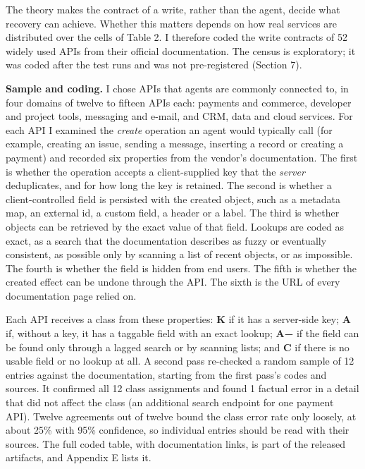 \documentclass[
  10pt,
]{article}
\begin{document}
The theory makes the contract of a write, rather than the agent, decide
what recovery can achieve. Whether this matters depends on how real
services are distributed over the cells of Table 2. I therefore coded
the write contracts of 52 widely used APIs from their official
documentation. The census is exploratory; it was coded after the test
runs and was not pre-registered (Section 7).

\textbf{Sample and coding.} I chose APIs that agents are commonly
connected to, in four domains of twelve to fifteen APIs each: payments
and commerce, developer and project tools, messaging and e-mail, and
CRM, data and cloud services. For each API I examined the \emph{create}
operation an agent would typically call (for example, creating an issue,
sending a message, inserting a record or creating a payment) and
recorded six properties from the vendor's documentation. The first is
whether the operation accepts a client-supplied key that the
\emph{server} deduplicates, and for how long the key is retained. The
second is whether a client-controlled field is persisted with the
created object, such as a metadata map, an external id, a custom field,
a header or a label. The third is whether objects can be retrieved by
the exact value of that field. Lookups are coded as exact, as a search
that the documentation describes as fuzzy or eventually consistent, as
possible only by scanning a list of recent objects, or as impossible.
The fourth is whether the field is hidden from end users. The fifth is
whether the created effect can be undone through the API. The sixth is
the URL of every documentation page relied on.

Each API receives a class from these properties: \textbf{K} if it has a
server-side key; \textbf{A} if, without a key, it has a taggable field
with an exact lookup; \textbf{A−} if the field can be found only through
a lagged search or by scanning lists; and \textbf{C} if there is no
usable field or no lookup at all. A second pass re-checked a random
sample of 12 entries against the documentation, starting from the first
pass's codes and sources. It confirmed all 12 class assignments and
found 1 factual error in a detail that did not affect the class (an
additional search endpoint for one payment API). Twelve agreements out
of twelve bound the class error rate only loosely, at about 25\% with
95\% confidence, so individual entries should be read with their
sources. The full coded table, with documentation links, is part of the
released artifacts, and Appendix E lists it.
\end{document}
